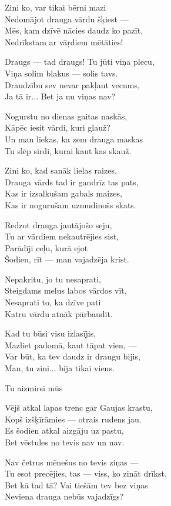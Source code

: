 \documentclass[14pt]{extarticle}
\begin{document}
{{Zini ko, var tikai bērni mazi\\
Nedomājot drauga vārdu šķiest ---\\
Mēs, kam dzīvē nācies daudz ko pazīt,\\
Nedrīkstam ar vāŗdiem mētāties!

Draugs --- tad draugs! Tu jūti viņa plecu,\\
Viņa solim blakus --- solis tavs.\\
Draudzību sev nevar pakļaut vecums,\\
Ja tā ir... Bet ja nu viņas nav?

Nogurstu no dienas gaitas naskās,\\
Kāpēc iesit vārdi, kuri glauž?\\
Un man liekas, ka zem drauga maskas\\
Tu slēp sirdi, kurai kaut kas skauž. 

Zini ko, kad sanāk lielas raizes,\\
Drauga vārds tad ir gandrīz tas pats,\\
Kas ir izsalkušam gabals maizes,\\
Kas ir nogurušam uzmudinošs skats.

Redzot drauga jautājošo seju,\\
Tu ar vārdiem nekautrējies sist,\\
Parādīji ceļu, kurā ejot\\
Šodien, rīt --- man vajadzēja krist. 

Nepakritu, jo tu nesaprati,\\
Steigdams melus labos vārdos vīt,\\
Nesaprati to, ka dzīve pati\\
Katru vārdu atnāk pārbaudīt. 

Kad tu būsi visu izlasījis,\\
Mazliet padomā, kaut tāpat vien, ---\\
Var būt, ka tev daudz ir draugu bijis,\\
Man, tu zini... bija tikai viens.


\newpage

{\large \sc Tu aizmirsi mūs}

Vējš atkal lapas trenc gar Gaujas krastu,\\
Kopš izšķīrāmies --- otrais rudens jau.\\
Es šodien atkal aizgāju uz pastu,\\
Bet vēstules no tevis nav un nav. 

Nav četrus mēnešus no tevis ziņas ---\\
Tu esot precējies, tas --- viss, ko zināt drīkst.\\
Bet kā tad tā? Vai tiešām tev bez viņas\\
Neviena drauga nebūs vajadzīgs?

}}
\end{document}
